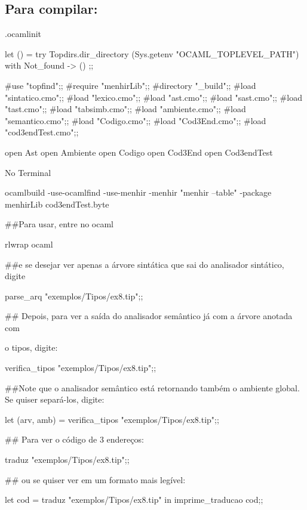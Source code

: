\documentclass[12pt,a4paper,twoside]{article}
\begin{document}
\subsection{Para compilar:}
.ocamlinit
\begin{terminal}
let () =
  try Topdirs.dir_directory (Sys.getenv "OCAML_TOPLEVEL_PATH")
  with Not_found -> ()
;;

#use "topfind";;
#require "menhirLib";;
#directory "_build";;
#load "sintatico.cmo";;
#load "lexico.cmo";;
#load "ast.cmo";;
#load "sast.cmo";;
#load "tast.cmo";;
#load "tabsimb.cmo";;
#load "ambiente.cmo";;
#load "semantico.cmo";;
#load "Codigo.cmo";;
#load "Cod3End.cmo";;
#load "cod3endTest.cmo";;

open Ast
open Ambiente
open Codigo
open Cod3End
open Cod3endTest
\end{terminal}
No Terminal
\begin{terminal}
    ocamlbuild -use-ocamlfind -use-menhir -menhir "menhir --table" -package menhirLib cod3endTest.byte
   
##Para usar, entre no ocaml 

    rlwrap ocaml


##e se desejar ver apenas a árvore sintática que sai do analisador sintático, digite

     parse_arq "exemplos/Tipos/ex8.tip";;

## Depois, para ver a saída do analisador semântico já com a árvore anotada com 

   o tipos, digite:

   verifica_tipos "exemplos/Tipos/ex8.tip";;

 ##Note que o analisador semântico está retornando também o ambiente global. Se quiser separá-los, digite:

   let (arv, amb) = verifica_tipos "exemplos/Tipos/ex8.tip";;
   
## Para ver o código de 3 endereços:

   traduz "exemplos/Tipos/ex8.tip";;
   
## ou se quiser ver em um formato mais legível:
   
    let cod = traduz "exemplos/Tipos/ex8.tip" in imprime_traducao cod;;
\end{terminal}
\end{document}
